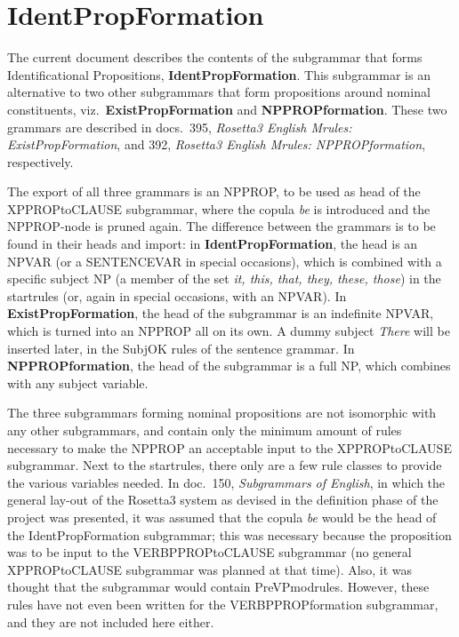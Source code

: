 
   \RosDate{\today}
   \RosSupersedes{-}
   \MakeRosTitle
%
%

\section{IdentPropFormation}
The current document describes the contents of 
the subgrammar that forms Identificational Propositions, {\bf 
IdentPropFormation}.
This subgrammar is an alternative to two other subgrammars that form 
propositions around nominal constituents, viz.\ {\bf ExistPropFormation} and {
\bf NPPROPformation}. These two grammars are described in docs.\ 395, {\em 
Rosetta3 English Mrules: ExistPropFormation\/}, and 392, {\em Rosetta3 English 
Mrules: NPPROPformation\/}, respectively. 

The export of all three grammars is 
an NPPROP, to be used as head of the XPPROPtoCLAUSE subgrammar, where the 
copula {\em be\/} is introduced and the NPPROP-node is pruned again. 
The difference between the grammars is to be 
found in their heads and import: in {\bf IdentPropFormation}, the head is an 
NPVAR (or a SENTENCEVAR in special occasions), which is combined with a 
specific subject NP (a member of the set {\em it, this, that, they, these, 
those\/}) in the startrules (or, again in special occasions, with an NPVAR). 
In {\bf ExistPropFormation}, the head of the 
subgrammar is an indefinite NPVAR, which is turned into an NPPROP all 
on its own. A dummy subject {\em There\/} will be inserted later, 
in the SubjOK rules of the sentence grammar. 
In {\bf NPPROPformation\/}, the head of the subgrammar is a 
full NP, which combines with any subject variable.

The three subgrammars forming nominal propositions are not isomorphic with any 
other subgrammars, and contain only the minimum amount of rules necessary 
to make the 
NPPROP an acceptable input to the XPPROPtoCLAUSE subgrammar. Next to the 
startrules, there only are a few rule classes to provide the various variables 
needed. In doc.\ 150, {\em Subgrammars of English\/}, in which the general 
lay-out of the Rosetta3 system as devised in the definition phase of the 
project was presented, it was assumed that the copula {\em be\/} would be 
the head of the IdentPropFormation subgrammar; this was necessary 
because the proposition was to be input to the VERBPPROPtoCLAUSE subgrammar
(no general XPPROPtoCLAUSE subgrammar was planned at that time). Also, it was 
thought that the subgrammar would contain PreVPmodrules. However, these rules 
have not even been written for the VERBPPROPformation subgrammar, and they are 
not included here either.

